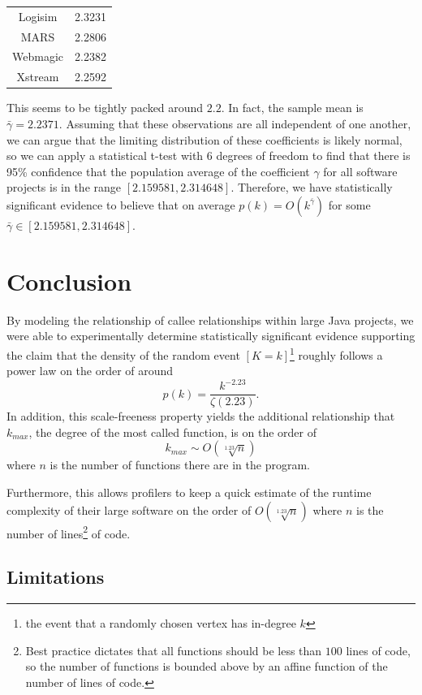 \documentclass[11pt,a4paper,twocolumn]{article}
\begin{document}
\begin{singlespace}
\begin{table}[H]
\begin{tabular}{|c|c|}
Logisim \cite{Logisim} & 2.3231 \\
MARS \cite{MARS} & 2.2806 \\
Webmagic \cite{WebMagic} & 2.2382 \\
Xstream \cite{Xstream} & 2.2592 \\ \hline
\end{tabular}
\end{table}
\noindent This seems to be tightly packed around $2.2$. In fact, the sample mean is
$\bar \gamma = 2.2371$. Assuming that these observations are all independent
of one another, we can argue that the limiting distribution of these coefficients
is likely normal, so we can apply a statistical t-test with 6 degrees of freedom to find
that there is 95\% confidence that the population average of the coefficient $\gamma$
for all software projects is in the range $[2.159581, 2.314648]$. Therefore, we have
 statistically significant evidence to believe that on average
 $p(k) = O(k^{\bar \gamma})$ for some $\bar \gamma \in [2.159581, 2.314648]$.
\section{Conclusion}
By modeling the relationship of callee relationships within large Java projects, we were
able to experimentally determine statistically significant evidence supporting
the claim that the density of the random event $[K = k]$\footnote{the event that a randomly
chosen vertex has in-degree $k$} roughly follows a power law on the order of around
$$p(k) = \frac{k^{-2.23}}{\zeta(2.23)}.$$ In addition, this scale-freeness property yields
the additional relationship that $k_{max}$, the degree of the most called function, is on the order of
$$k_{max} \sim O(\sqrt[1.23]{n})$$ where $n$ is the number of functions there are in the program.

Furthermore, this allows profilers to keep a quick estimate of the runtime complexity
of their large software on the order of $O(\sqrt[1.23]{n})$ where $n$ is the number of
lines\footnote{Best practice dictates that all functions should be less than $100$ lines
of code, so the number of functions is bounded above by an affine function of
the number of lines of code.} of code.
\subsection*{Limitations}


\end{singlespace}
\end{document}
